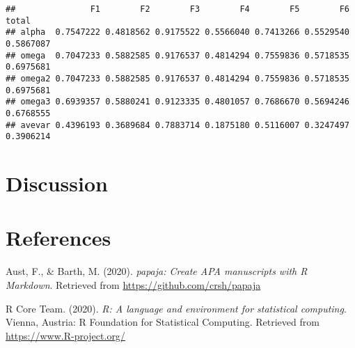 \documentclass[
  english,
  man]{apa6}
\newlength{\cslhangindent}
\newenvironment{CSLReferences}[2] %
 {%
  \setlength{\parindent}{0pt}
  \ifodd #1 \everypar{\setlength{\hangindent}{\cslhangindent}}\ignorespaces\fi
  \ifnum #2 > 0
  \setlength{\parskip}{#2\baselineskip}
  \fi
 }%
 {}
\begin{document}
\begin{verbatim}
##               F1        F2        F3        F4        F5        F6     total
## alpha  0.7547222 0.4818562 0.9175522 0.5566040 0.7413266 0.5529540 0.5867087
## omega  0.7047233 0.5882585 0.9176537 0.4814294 0.7559836 0.5718535 0.6975681
## omega2 0.7047233 0.5882585 0.9176537 0.4814294 0.7559836 0.5718535 0.6975681
## omega3 0.6939357 0.5880241 0.9123335 0.4801057 0.7686670 0.5694246 0.6768555
## avevar 0.4396193 0.3689684 0.7883714 0.1875180 0.5116007 0.3247497 0.3906214
\end{verbatim}

\hypertarget{discussion}{%
\section{Discussion}\label{discussion}}

\newpage

\hypertarget{references}{%
\section{References}\label{references}}

\begingroup
\setlength{\parindent}{-0.5in}
\setlength{\leftskip}{0.5in}

\hypertarget{refs}{}
\begin{CSLReferences}{1}{0}
\leavevmode{}%
Aust, F., \& Barth, M. (2020). \emph{{papaja}: {Create} {APA} manuscripts with {R Markdown}}. Retrieved from \url{https://github.com/crsh/papaja}

\leavevmode{}%
R Core Team. (2020). \emph{R: A language and environment for statistical computing}. Vienna, Austria: R Foundation for Statistical Computing. Retrieved from \url{https://www.R-project.org/}

\end{CSLReferences}

\endgroup
\end{document}

